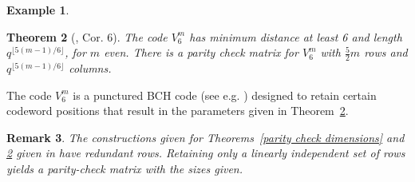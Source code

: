 \documentclass[12pt]{article}%
\newtheorem{theorem}{Theorem}[section]
\newtheorem{definition}[theorem]{Definition}
\newtheorem{example}[theorem]{Example}
\newtheorem{remark}[theorem]{Remark}
\def\katie#1{\noindent
\textcolor{blue}
{\textsc{(Katie:}
\textsf{#1})}}
\begin{document}
\begin{example}


    
\end{example}



\begin{theorem}[\cite{dumerdouble}, Cor. 6] \label{d6 parity check dimensions}
 The code $V_6^m$ %
 has minimum distance at least 6 and length $q^{\lfloor 5(m-1)/6\rfloor}$, for $m$ even. There is a parity check matrix for $V_6^m$ with $\frac{5}{2}m$ rows and $q^{\lfloor 5(m-1)/6\rfloor}$ columns.     
\end{theorem}

The code $V_6^m$ is a punctured BCH code (see e.g. \cite{macwilliams1977theory}) designed to   
retain certain  codeword positions that result in the parameters given in Theorem~\ref{d6 parity check dimensions}. 



\begin{remark}
    The constructions given for Theorems~\ref{parity check dimensions} and \ref{d6 parity check dimensions} %
    given in \cite{dumerdouble} have redundant rows. Retaining only a linearly independent set of rows  yields a parity-check matrix with the sizes given.
\end{remark}


\end{document}
